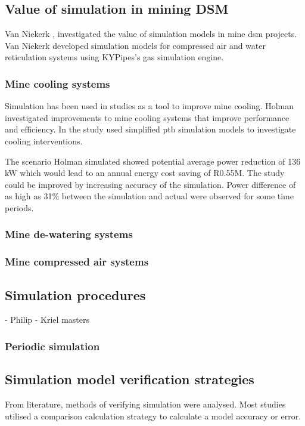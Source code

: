 	\subsection{Value of simulation in mining DSM}
	Van Niekerk \cite{van2013value},\cite{vanNiekerk2012Value} investigated the value of simulation models in mine \gls{dsm} projects. Van Niekerk developed simulation models for compressed air and water reticulation systems using KYPipes's gas simulation engine. \\
	
	\subsubsection{Mine cooling systems}
	Simulation has been used in studies as a tool to improve mine cooling. Holman \cite{Holman2014Masters} investigated improvements to mine cooling systems that improve performance and efficiency. In the study \cite{Holman2014Masters}  used simplified \gls{ptb}  simulation models to investigate cooling interventions.
	\par 
	The scenario Holman simulated showed potential  average power reduction of 136 kW  which would lead to an annual energy cost saving of R0.55M. The study could be improved by increasing accuracy of the simulation. Power difference of as high as 31\% between the simulation and actual were observed for some time periods.
	\subsubsection{Mine de-watering systems}
	
	\subsubsection{Mine compressed air systems}
		
	\subsection{Simulation procedures}
		- Philip
		- Kriel masters\\
		\subsubsection{Periodic simulation}
 	\subsection{Simulation model verification strategies}
 	From literature, methods of verifying simulation were analysed. Most studies utilised a comparison calculation strategy to calculate a model accuracy or error. %

